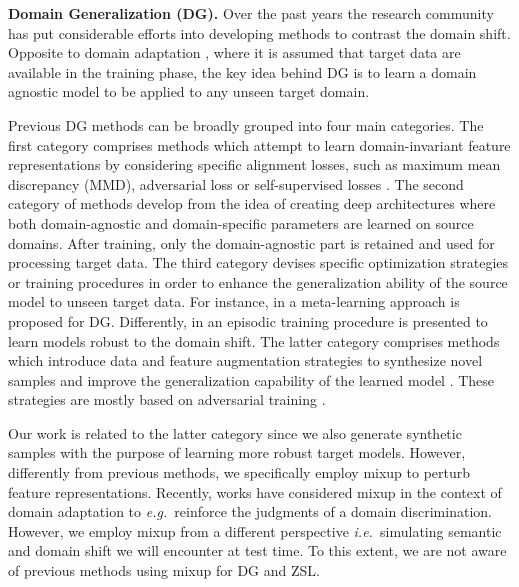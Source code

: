 \documentclass[runningheads]{llncs}
\newcommand{\eg}{\emph{e.g.~}}
\newcommand{\ie}{\emph{i.e.~}}
\newcommand{\myparagraph}[1]{\noindent\textbf{#1}}
\begin{document}
\myparagraph{Domain Generalization (DG).} Over the past years the research community has put considerable efforts into developing methods to contrast the domain shift. Opposite to domain adaptation \cite{csurka2017domain}, where it is assumed that target data are available in the training phase, the key idea behind DG is to learn a domain agnostic model to be applied to any unseen target domain. 

Previous DG methods can be broadly grouped into four main categories.
The first category comprises methods which attempt to learn
domain-invariant feature representations \cite{muandet2013domain} by considering specific alignment losses, such as maximum mean discrepancy (MMD), adversarial loss \cite{li2018domainadv} or self-supervised losses \cite{carlucci2019domain}. 
The second category of methods \cite{li2017deeper,khosla2012undoing} 
develop from the idea of creating deep architectures where both domain-agnostic and domain-specific parameters are learned on source domains. After training, only the domain-agnostic part is retained and used for processing target data. 
The third category devises specific optimization strategies or training procedures in order to enhance the generalization ability of the source model to unseen target data. For instance, in \cite{li2018learning} a meta-learning approach is proposed for DG. Differently, in \cite{li2019episodic} an episodic training procedure is presented to learn models robust to the domain shift. 
The latter category comprises methods which introduce 
data and feature augmentation strategies to synthesize novel samples and improve the generalization capability of the learned model \cite{shankar2018generalizing,volpi2018generalizing,volpi2019addressing}. These strategies are mostly based on adversarial training \cite{shankar2018generalizing,volpi2018generalizing}.

Our work is related to the latter category since we also generate synthetic samples with the purpose of learning more robust target models. However, differently from previous methods, we specifically employ mixup to perturb feature representations.
Recently, works have considered mixup in the context of domain adaptation {\cite{xu2019adversarial}} to \eg reinforce the judgments of a domain discrimination. However, we employ mixup from a different perspective \ie simulating semantic and domain shift we will encounter at test time. To this extent, we are not aware of previous methods using mixup for DG and ZSL.
\end{document}
